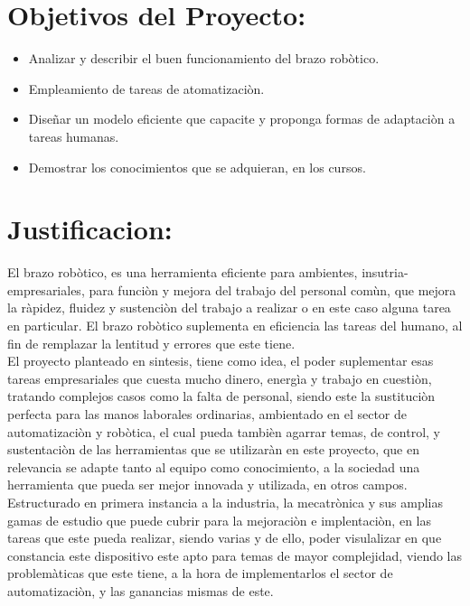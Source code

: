 \documentclass[14pt,a4paper]{article}
\begin{document}
\section{Objetivos del Proyecto:}

\begin{itemize}
\item Analizar y describir el buen funcionamiento del brazo robòtico.
\item Empleamiento de tareas de atomatizaciòn.
\item Diseñar un modelo eficiente que capacite y proponga formas de adaptaciòn a tareas humanas.
\item Demostrar los conocimientos que se adquieran, en los cursos. 
\end{itemize}

\section{Justificacion:}

El brazo robòtico, es una herramienta eficiente para ambientes, insutria-empresariales, para funciòn y mejora del trabajo del personal comùn, que mejora la ràpidez, fluidez y sustenciòn del trabajo a realizar o en este caso alguna tarea en particular. El brazo robòtico suplementa en eficiencia las tareas del humano, al fin de remplazar la lentitud y errores que este tiene.\\
El proyecto planteado en sintesis, tiene como idea, el  poder suplementar esas tareas empresariales que cuesta mucho dinero, energìa y trabajo en cuestiòn, tratando complejos casos como la falta de personal, siendo este la sustituciòn perfecta para las manos laborales ordinarias, ambientado en el sector de automatizaciòn y robòtica, el cual pueda tambièn agarrar temas, de control, y sustentaciòn de las herramientas que se utilizaràn en este proyecto, que en relevancia se adapte tanto al equipo como conocimiento, a la sociedad una herramienta que pueda ser mejor innovada y utilizada, en otros campos.\\
Estructurado en primera instancia a la industria, la mecatrònica y sus amplias gamas de estudio que puede cubrir para la mejoraciòn e implentaciòn, en las tareas que este pueda realizar, siendo varias y de ello, poder visulalizar en que constancia este dispositivo este apto para temas de mayor complejidad, viendo las problemàticas que este tiene, a la  hora de implementarlos el sector de automatizaciòn, y las ganancias mismas de este.
\end{document}
